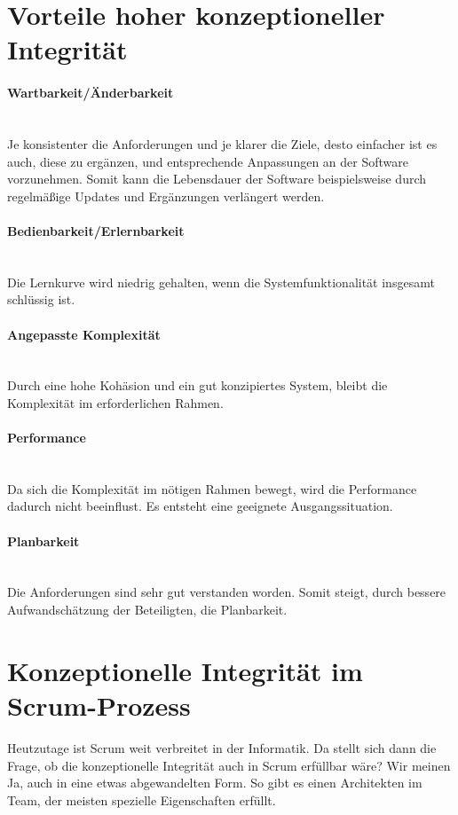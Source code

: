 \documentclass[a4paper, ngerman, 12pt, usenames, dvipsnames]{article}
\begin{document}
\section{Vorteile hoher konzeptioneller Integrität}
\paragraph{Wartbarkeit/Änderbarkeit}\mbox{} \\
Je konsistenter die Anforderungen und je klarer die Ziele, desto einfacher ist es auch, diese zu ergänzen, und entsprechende Anpassungen an der Software vorzunehmen. 
Somit kann die Lebensdauer der Software beispielsweise durch regelmäßige Updates und Ergänzungen verlängert werden.
\paragraph{Bedienbarkeit/Erlernbarkeit}\mbox{} \\
Die Lernkurve wird niedrig gehalten, wenn die Systemfunktionalität insgesamt schlüssig ist.
\paragraph{Angepasste Komplexität}\mbox{} \\
Durch eine hohe Kohäsion und ein gut konzipiertes System, bleibt die Komplexität im erforderlichen Rahmen.
\paragraph{Performance}\mbox{} \\
Da sich die Komplexität im nötigen Rahmen bewegt, wird die Performance dadurch nicht beeinflust.
Es entsteht eine geeignete Ausgangssituation.
\paragraph{Planbarkeit}\mbox{} \\
Die Anforderungen sind sehr gut verstanden worden. Somit steigt, durch bessere Aufwandschätzung der Beteiligten, die Planbarkeit.

\section{Konzeptionelle Integrität im Scrum-Prozess}
Heutzutage ist Scrum weit verbreitet in der Informatik. Da stellt sich dann die Frage, ob die konzeptionelle Integrität auch in Scrum erfüllbar wäre?
Wir meinen Ja, auch in eine etwas abgewandelten Form. So gibt es einen Architekten im Team, der meisten spezielle Eigenschaften erfüllt.
\end{document}
